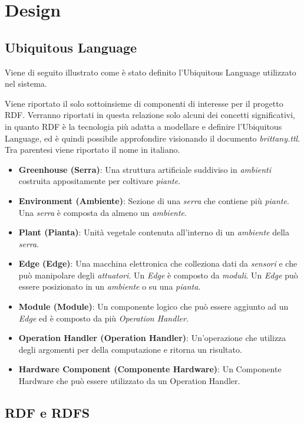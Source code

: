 \section{Design}

\subsection{Ubiquitous Language}
Viene di seguito illustrato come è stato definito l’Ubiquitous Language utilizzato nel sistema.

\noindent Viene riportato il solo sottoinsieme di componenti di interesse per il progetto RDF. Verranno riportati in questa relazione solo alcuni dei concetti significativi, in quanto RDF è la tecnologia più adatta a modellare e definire l'Ubiquitous Language, ed è quindi possibile approfondire visionando il documento \textit{brittany.ttl}. Tra parentesi viene riportato il nome in italiano.

\begin{itemize}
	\item \textbf{Greenhouse (Serra)}: Una struttura artificiale suddiviso in \textit{ambienti} costruita appositamente per coltivare \textit{piante}.
	\item \textbf{Environment (Ambiente)}: Sezione di una \textit{serra} che contiene più \textit{piante}. Una \textit{serra} è composta da almeno un \textit{ambiente}.
	\item \textbf{Plant (Pianta)}: Unità vegetale contenuta all’interno di un \textit{ambiente} della \textit{serra}.
	\item \textbf{Edge (Edge)}: Una macchina elettronica che colleziona dati da \textit{sensori} e che può manipolare degli \textit{attuatori}. Un \textit{Edge} è composto da \textit{moduli}. Un \textit{Edge} può essere posizionato in un \textit{ambiente} o su una \textit{pianta}.
	\item \textbf{Module (Module)}: Un componente logico che può essere aggiunto ad un \textit{Edge} ed è composto da più \textit{Operation Handler}.
	\item \textbf{Operation Handler (Operation Handler)}: Un'operazione che utilizza degli argomenti per della computazione e ritorna un risultato.
	\item \textbf{Hardware Component (Componente Hardware)}: Un Componente Hardware che può essere utilizzato da un Operation Handler.
\end{itemize}

\subsection{RDF e RDFS}

